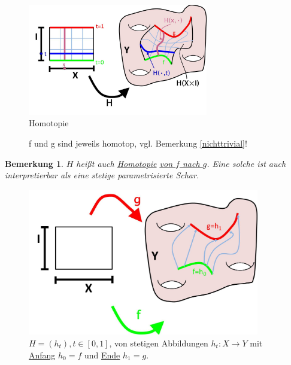 \documentclass[a4paper,11pt,notitlepage]{report}
\newtheorem{remark}{Bemerkung}[chapter]
\begin{document}
\begin{figure}[h]
\centering
\includegraphics[width=0.7\textwidth]{images/Homotopie.jpg}
\caption{Homotopie}
\end{figure}

\begin{figure}[h]
\centering
{}\qquad
{}
\caption{f und g sind jeweils homotop, vgl. Bemerkung \ref{nichttrivial}!}
\end{figure}

\begin{remark}
$H$ heißt auch \underline{Homotopie} \underline{\underline{von $f$ nach $g$}}. Eine solche ist auch interpretierbar als eine stetige parametrisierte Schar.
\end{remark}

\begin{figure}[h]
\centering
\includegraphics[width=0.9\textwidth]{images/Homotopie_param.jpg}
\caption{$H = (h_t), t \in [0,1]$, von stetigen Abbildungen $h_t \colon X \rightarrow Y$ mit \underline{Anfang} $h_0=f$ und \underline{Ende} $h_1=g$.}
\end{figure}
\end{document}
